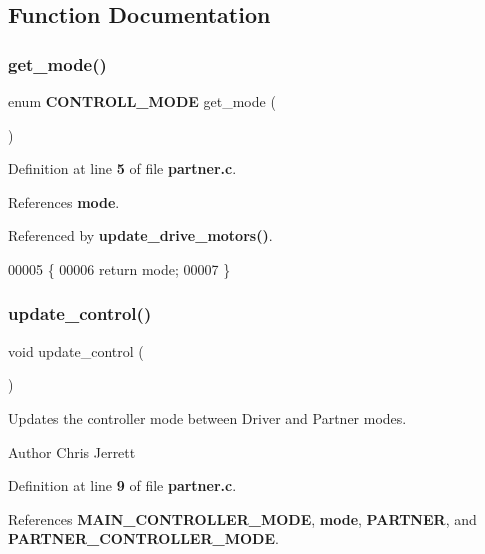 \subsection{Function Documentation}
\mbox{\label{partner_8c_aacc86d07e59d3b919f5c5eae2ce5d404}} 
\subsubsection{get\+\_\+mode()}
{\footnotesize\ttfamily enum \textbf{ C\+O\+N\+T\+R\+O\+L\+L\+\_\+\+M\+O\+DE} get\+\_\+mode (\begin{DoxyParamCaption}{ }\end{DoxyParamCaption})}



Definition at line \textbf{ 5} of file \textbf{ partner.\+c}.



References \textbf{ mode}.



Referenced by \textbf{ update\+\_\+drive\+\_\+motors()}.


\begin{DoxyCode}
00005                               \{
00006   \textcolor{keywordflow}{return} mode;
00007 \}
\end{DoxyCode}
\mbox{\label{partner_8c_ab2c78903a76d2ed8969271803c78368a}} 
\subsubsection{update\+\_\+control()}
{\footnotesize\ttfamily void update\+\_\+control (\begin{DoxyParamCaption}{ }\end{DoxyParamCaption})}



Updates the controller mode between Driver and Partner modes. 

\begin{DoxyAuthor}{Author}
Chris Jerrett 
\end{DoxyAuthor}


Definition at line \textbf{ 9} of file \textbf{ partner.\+c}.



References \textbf{ M\+A\+I\+N\+\_\+\+C\+O\+N\+T\+R\+O\+L\+L\+E\+R\+\_\+\+M\+O\+DE}, \textbf{ mode}, \textbf{ P\+A\+R\+T\+N\+ER}, and \textbf{ P\+A\+R\+T\+N\+E\+R\+\_\+\+C\+O\+N\+T\+R\+O\+L\+L\+E\+R\+\_\+\+M\+O\+DE}.


